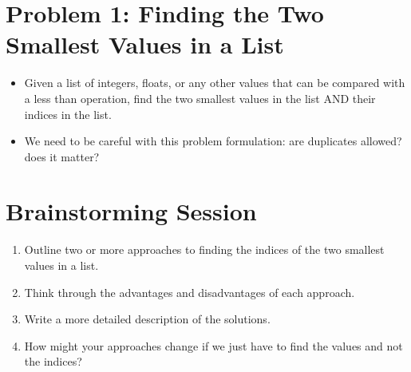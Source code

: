\documentclass[letterpaper,10pt,english]{sphinxmanual}
\begin{document}
\section{Problem 1: Finding the Two Smallest Values in a List}
\label{\detokenize{lecture_notes/lec20_searching:problem-1-finding-the-two-smallest-values-in-a-list}}\begin{itemize}
\item {} 
Given a list of integers, floats, or any other values that can be
compared with a less than operation, find the two smallest values in
the list AND their indices in the list.

\item {} 
We need to be careful with this problem formulation: are duplicates
allowed? does it matter?

\end{itemize}


\section{Brainstorming Session}
\label{\detokenize{lecture_notes/lec20_searching:brainstorming-session}}\begin{enumerate}
\def\theenumi{\arabic{enumi}}
\def\labelenumi{\theenumi .}
\makeatletter\def\p@enumii{\p@enumi \theenumi .}\makeatother
\item {} 
Outline two or more approaches to finding the indices of the two
smallest values in a list.

\item {} 
Think through the advantages and disadvantages of each approach.

\item {} 
Write a more detailed description of the solutions.

\item {} 
How might your approaches change if we just have to find the values
and not the indices?

\end{enumerate}
\end{document}
